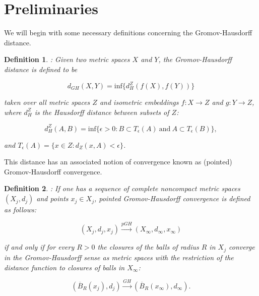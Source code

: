 \documentclass[12pt, letterpaper]{article}
\newtheorem{definition}{Definition}
\begin{document}






 






\section{Preliminaries}

\noindent
We will begin with some necessary definitions concerning the Gromov-Hausdorff distance.

\begin{definition}: Given two metric spaces $X$ and $Y$, the Gromov-Hausdorff distance is defined to be 

\[ d_{GH}(X,Y) = \text{inf} \bigg\{ d_H^Z(f(X),f(Y)) \bigg\} \]

\noindent
taken over all metric spaces $Z$ and isometric embeddings $f: X \rightarrow Z$ and $g: Y \rightarrow Z$, where $d_H^Z$ is the Hausdorff distance between subsets of $Z$:

\[ d_H^Z (A,B) =  \text{inf} \{ \epsilon > 0 : B \subset T_{\epsilon}(A) \: \text{and} \: A \subset T_{\epsilon}(B) \} ,\]

\noindent
and $T_{\epsilon}(A) = \{ x \in Z : d_Z(x,A) < \epsilon \}$. \end{definition}

\noindent
This distance has an associated notion of convergence known as (pointed) Gromov-Hausdorff convergence.


\begin{definition}: If one has a sequence of complete noncompact metric spaces $(X_j, d_j)$ and points $x_j \in X_j$, pointed Gromov-Hausdorff convergence is defined as follows:

\[ (X_j, d_j, x_j) \xrightarrow{pGH} (X_{\infty}, d_{\infty}, x_{\infty})    \]

\noindent
if and only if for every $R > 0$ the closures of the balls of radius $R$ in $X_j$ converge in the Gromov-Hausdorff sense as metric spaces with the restriction of the distance function to closures of balls in $X_{\infty}$:

\[ (\overline{B}_R (x_j), d_j) \xrightarrow{GH} (\overline{B}_R (x_{\infty}), d_{\infty}).  \]
\end{definition}
\end{document}
